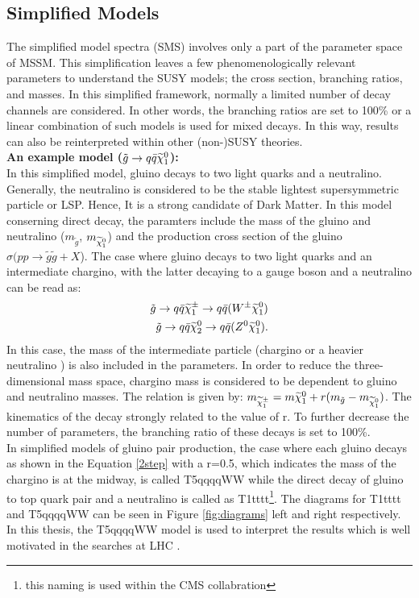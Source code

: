 \subsection{Simplified Models}
\label{sec:simplifiedModels}
The simplified model spectra (SMS) involves only a part of the parameter space of MSSM.  This simplification leaves a few phenomenologically relevant parameters to understand the SUSY models; the cross section, branching ratios, and masses.  In this simplified framework, normally a limited number of decay channels are considered. In other words, the branching ratios are set to 100\% or a linear combination of such models is used for mixed decays.  In this way, results can also be reinterpreted within other (non-)SUSY theories.\\
\textbf{An example model ($\tilde{g} \rightarrow q\bar{q}\widetilde{\chi}^0_1$):}
\\
In this simplified model, gluino decays to two light quarks and a neutralino. Generally, the neutralino is considered to be the stable lightest supersymmetric particle or LSP. Hence, It is a strong candidate of Dark Matter. In this model conserning direct decay, the paramters include the mass of the gluino and neutralino ($m_{\tilde{g}}$, $m_{\widetilde{\chi}^0_1}$) and the production cross section of the gluino $\sigma(pp\rightarrow \tilde{g}\tilde{g}+X$). The case where gluino decays to two light quarks and an intermediate chargino, with the latter decaying to a gauge boson and a neutralino can be read as:
\begin{eqnarray}
\label{2step}
\tilde{g} \rightarrow q\bar{q}\widetilde{\chi}^{\pm}_1 \rightarrow q\bar{q}(W^{\pm} \widetilde{\chi}^0_1) \\
\tilde{g} \rightarrow q\bar{q}\widetilde{\chi}^0_2 \rightarrow q\bar{q}(Z^0 \widetilde{\chi}^0_1) .
\end{eqnarray}
In this case, the mass of the intermediate particle (chargino \chipmone or a heavier neutralino \ninotwo) is also included in the parameters. In order to reduce the three-dimensional mass space, chargino mass is considered to be dependent to gluino and neutralino masses. The relation is given by: $m_{\widetilde{\chi}^{\pm}_1} = m{\widetilde{\chi}^0_1} + r(m_{\tilde{g}} - m_{\widetilde{\chi}^0_1})$. The kinematics of the decay strongly related to the value of r. To further decrease the number of parameters, the branching ratio of these decays is set to 100\%. \\
In simplified models of gluino pair production, the case where each gluino decays as shown in the Equation \ref{2step} with a r=0.5, which indicates the mass of the chargino is at the midway, is called T5qqqqWW while the direct decay of gluino to top quark pair and  a neutralino is called as T1tttt\footnote{this naming is used within the CMS collabration}. The diagrams for T1tttt and T5qqqqWW can be seen in Figure \ref{fig:diagrams} left and right respectively. In this thesis, the T5qqqqWW model is used to interpret the results which is well motivated in the searches at LHC \cite{t51,t52}. \\
